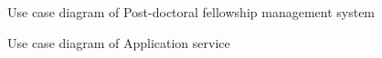 \documentclass[12pt]{article}
\begin{document}
\begin{figure}[H]
\centering	
{}
\caption{Use case diagram of Post-doctoral fellowship management system}
\end{figure}

\begin{figure}[H]
\centering	
{}
\caption{Use case diagram of Application service}
\end{figure}
\end{document}
